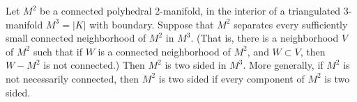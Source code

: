 Let $M^2$ be a connected polyhedral 2-manifold, in the interior of a triangulated 3-manifold $M^3 = |K|$ with boundary. Suppose that $M^2$ separates every sufficiently small connected neighborhood of $M^2$ in $M^3$. (That is, there is a neighborhood $V$ of $M^2$ such that if $W$ is a connected neighborhood of $M^2$, and $W \subset V$, then $W - M^2$ is not connected.) Then $M^2$ is two sided in $M^3$. More generally, if $M^2$ is not necessarily connected, then $M^2$ is two sided if every component of $M^2$ is two sided.
